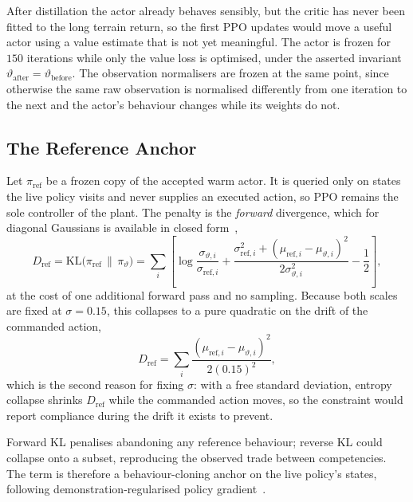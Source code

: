 After distillation the actor already behaves sensibly, but the critic has never
been fitted to the long terrain return, so the first PPO updates would move a
useful actor using a value estimate that is not yet meaningful. The actor is
frozen for $150$ iterations while only the value loss is optimised, under the
asserted invariant $\vartheta_{\text{after}} = \vartheta_{\text{before}}$. The
observation normalisers are frozen at the same point, since otherwise the same
raw observation is normalised differently from one iteration to the next and the
actor's behaviour changes while its weights do not.

\subsection{The Reference Anchor}

Let $\pi_{\mathrm{ref}}$ be a frozen copy of the accepted warm actor. It is
queried only on states the live policy visits and never supplies an executed
action, so PPO remains the sole controller of the plant. The penalty is the
\emph{forward} divergence, which for diagonal Gaussians is available in closed
form~\cite{cover2006information},
%
\begin{equation}
  \label{eq:ctrl:kl}
  D_{\mathrm{ref}}
  = \mathrm{KL}\bigl(\pi_{\mathrm{ref}} \,\|\, \pi_\vartheta\bigr)
  = \sum_i \left[
    \log\frac{\sigma_{\vartheta,i}}{\sigma_{\mathrm{ref},i}}
    + \frac{\sigma_{\mathrm{ref},i}^{2}
      + (\mu_{\mathrm{ref},i}-\mu_{\vartheta,i})^{2}}
      {2\sigma_{\vartheta,i}^{2}}
    - \frac{1}{2}\right],
\end{equation}
%
at the cost of one additional forward pass and no sampling. Because both scales
are fixed at $\sigma = 0.15$, this collapses to a pure quadratic on the drift of
the commanded action,
%
\begin{equation}
  \label{eq:ctrl:kl-fixed}
  D_{\mathrm{ref}}
  = \sum_i \frac{(\mu_{\mathrm{ref},i}-\mu_{\vartheta,i})^{2}}{2(0.15)^{2}},
\end{equation}
%
which is the second reason for fixing $\sigma$: with a free standard deviation,
entropy collapse shrinks $D_{\mathrm{ref}}$ while the commanded action moves, so
the constraint would report compliance during the drift it exists to prevent.

Forward KL penalises abandoning any reference behaviour; reverse KL could
collapse onto a subset, reproducing the observed trade between competencies.
The term is therefore a behaviour-cloning anchor on the live policy's states,
following demonstration-regularised policy gradient~\cite{rajeswaran2018dapg}.

